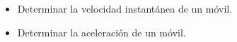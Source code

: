 \documentclass[../main]{subfiles}
\begin{document}
\begin{itemize}
  \item Determinar la velocidad instantánea de un móvil.
  \item Determinar la aceleración de un móvil.
\end{itemize}
\end{document}
